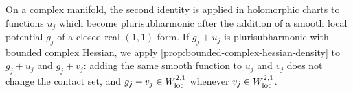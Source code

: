 On a complex manifold, the second identity is applied in holomorphic charts to functions $u_j$ which become plurisubharmonic after the addition of a smooth local potential $g_j$ of a closed real $(1,1)$-form. If $g_j+u_j$ is plurisubharmonic with bounded complex Hessian, we apply \cref{prop:bounded-complex-hessian-density} to $g_j+u_j$ and $g_j+v_j$: adding the same smooth function to $u_j$ and $v_j$ does not change the contact set, and $g_j+v_j\in W^{2,1}_{\mathrm{loc}}$ whenever $v_j\in W^{2,1}_{\mathrm{loc}}$.
